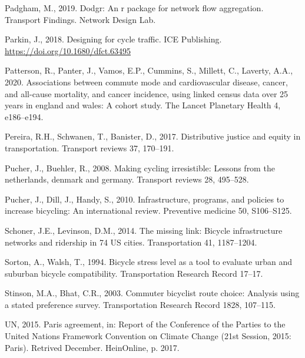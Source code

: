 \documentclass[
]{article}
\newlength{\cslhangindent}
\newlength{\cslentryspacingunit} %
\newenvironment{CSLReferences}[2] %
 {%
  \setlength{\parindent}{0pt}
  \ifodd #1
  \let\oldpar\par
  \def\par{\hangindent=\cslhangindent\oldpar}
  \fi
  \setlength{\parskip}{#2\cslentryspacingunit}
 }%
 {}
\begin{document}
\begin{CSLReferences}{1}{0}
\leavevmode{}%
Padgham, M., 2019. Dodgr: An r package for network flow aggregation. Transport Findings. Network Design Lab.

\leavevmode{}%
Parkin, J., 2018. Designing for cycle traffic. ICE Publishing. \url{https://doi.org/10.1680/dfct.63495}

\leavevmode{}%
Patterson, R., Panter, J., Vamos, E.P., Cummins, S., Millett, C., Laverty, A.A., 2020. Associations between commute mode and cardiovascular disease, cancer, and all-cause mortality, and cancer incidence, using linked census data over 25 years in england and wales: A cohort study. The Lancet Planetary Health 4, e186--e194.

\leavevmode{}%
Pereira, R.H., Schwanen, T., Banister, D., 2017. Distributive justice and equity in transportation. Transport reviews 37, 170--191.

\leavevmode{}%
Pucher, J., Buehler, R., 2008. Making cycling irresistible: Lessons from the netherlands, denmark and germany. Transport reviews 28, 495--528.

\leavevmode{}%
Pucher, J., Dill, J., Handy, S., 2010. Infrastructure, programs, and policies to increase bicycling: An international review. Preventive medicine 50, S106--S125.

\leavevmode{}%
Schoner, J.E., Levinson, D.M., 2014. The missing link: Bicycle infrastructure networks and ridership in 74 US cities. Transportation 41, 1187--1204.

\leavevmode{}%
Sorton, A., Walsh, T., 1994. Bicycle stress level as a tool to evaluate urban and suburban bicycle compatibility. Transportation Research Record 17--17.

\leavevmode{}%
Stinson, M.A., Bhat, C.R., 2003. Commuter bicyclist route choice: Analysis using a stated preference survey. Transportation Research Record 1828, 107--115.

\leavevmode{}%
UN, 2015. Paris agreement, in: Report of the Conference of the Parties to the United Nations Framework Convention on Climate Change (21st Session, 2015: Paris). Retrived December. HeinOnline, p. 2017.


\end{CSLReferences}
\end{document}

